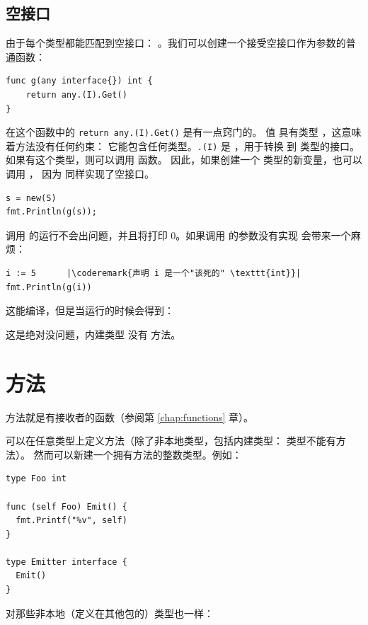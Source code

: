 \subsection{空接口}
由于每个类型都能匹配到空接口：
。我们可以创建一个接受空接口作为参数的普通函数：
\begin{lstlisting}[caption=空接口参数的函数t,label=src:interface empty]
func g(any interface{}) int { 
    return any.(I).Get() 
}
\end{lstlisting}
在这个函数中的 \lstinline{return any.(I).Get()} 是有一点窍门的。
值  具有类型 ，这意味着方法没有任何约束：
它能包含任何类型。\lstinline{.(I)} 是 ，用于转换  到
 类型的接口。如果有这个类型，则可以调用  函数。
因此，如果创建一个  类型的新变量，也可以调用 ，
因为  同样实现了空接口。
\begin{lstlisting}
s = new(S)
fmt.Println(g(s));
\end{lstlisting}
调用  的运行不会出问题，并且将打印 0。如果调用  的参数没有实现  
会带来一个麻烦：
\begin{lstlisting}[caption=接口实现异常,label=src:interface fail]
i := 5		|\coderemark{声明 i 是一个"该死的" \texttt{int}}|
fmt.Println(g(i))
\end{lstlisting}
这能编译，但是当运行的时候会得到：

\noindent{}

\noindent{}这是绝对没问题，内建类型  没有  方法。

\section{方法}
方法就是有接收者的函数（参阅第 \ref{chap:functions} 章）。

可以在任意类型上定义方法（除了非本地类型，包括内建类型： 类型不能有方法）。
然而可以新建一个拥有方法的整数类型。例如：
\begin{lstlisting}
type Foo int

func (self Foo) Emit() {
  fmt.Printf("%v", self)
}

type Emitter interface {
  Emit()
}
\end{lstlisting}
对那些非本地（定义在其他包的）类型也一样：

